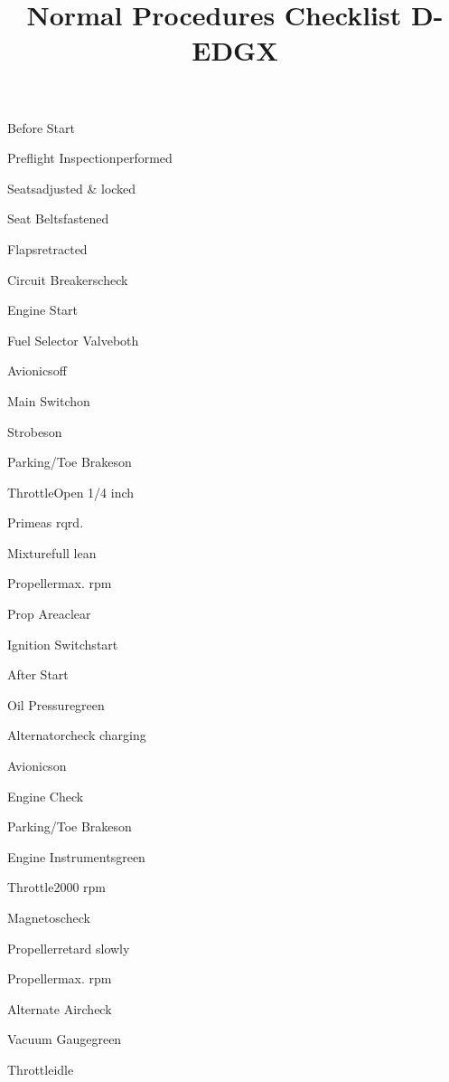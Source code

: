\def\papersize{4}




\title{Normal Procedures Checklist D-EDGX}

\begin{checklist}{Before Start}
  \item{Preflight Inspection}{performed}
  \item{Seats}{adjusted \& locked}
  \item{Seat Belts}{fastened}
  \item{Flaps}{retracted}
  \item{Circuit Breakers}{check}
\end{checklist}

\begin{checklist}{Engine Start}
  \item{Fuel Selector Valve}{both}
  \item{Avionics}{off}
  \item{Main Switch}{on}
  \item{Strobes}{on}
  \item{Parking/Toe Brakes}{on}
  \item{Throttle}{Open 1/4 inch}
  \item{Prime}{as rqrd.}
  \item{Mixture}{full lean}
  \item{Propeller}{max. rpm}
  \item{Prop Area}{clear}
  \item{Ignition Switch}{start}
\end{checklist}

\begin{checklist}{After Start}
  \item{Oil Pressure}{green}
  \item{Alternator}{check charging}
  \item{Avionics}{on}
\end{checklist}

\begin{checklist}{Engine Check}
  \item{Parking/Toe Brakes}{on}
  \item{Engine Instruments}{green}
  \item{Throttle}{2000 rpm}
  \item{Magnetos}{check}
  \item{Propeller}{retard slowly}
  \item{Propeller}{max. rpm}
  \item{Alternate Air}{check}
  \item{Vacuum Gauge}{green}
  \item{Throttle}{idle}
\end{checklist}

